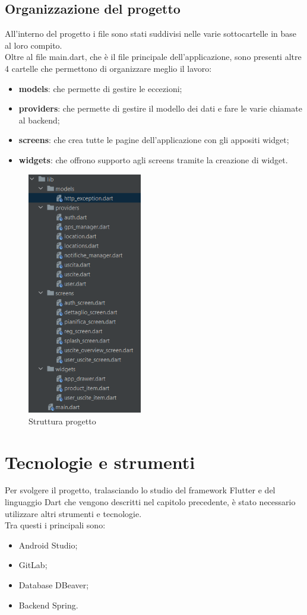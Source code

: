  \newpage

\subsection{Organizzazione del progetto}

All'interno del progetto i file sono stati suddivisi nelle varie sottocartelle in base al loro compito.\\
Oltre al file main.dart, che è il file principale dell'applicazione, sono presenti altre 4 cartelle che permettono di organizzare meglio il lavoro:
\begin{itemize}
	\item \textbf{models}: che permette di gestire le eccezioni;
	\item \textbf{providers}: che permette di gestire il modello dei dati e fare le varie chiamate al backend;
	\item \textbf{screens}: che crea tutte le pagine dell'applicazione con gli appositi widget;
	\item \textbf{widgets}: che offrono supporto agli screens tramite la creazione di widget.
\end{itemize}
\begin{figure}[htbp]	
	\centering
	\includegraphics[width=5cm]{immagini/struttura.png}
	\caption{Struttura progetto}
	\label{fig:Struttura progetto}
\end{figure}

\newpage

\section{Tecnologie e strumenti}
Per svolgere il progetto, tralasciando lo studio del framework Flutter e del linguaggio Dart che vengono descritti nel capitolo precedente, è stato necessario utilizzare altri strumenti e tecnologie.\\
Tra questi i principali sono:
\begin{itemize}
	\item Android Studio;
	\item GitLab;
	\item Database DBeaver;
	\item Backend Spring.
\end{itemize}

